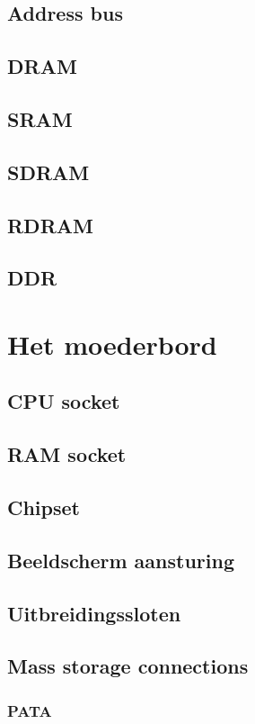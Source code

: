 \documentclass[a4paper,12pt,twoside,openright,titlepage]{book}
\begin{document}
\section{Address bus}
\section{DRAM}
\section{SRAM}
\section{SDRAM}
\section{RDRAM}
\section{DDR}

\chapter{Het moederbord}

\section{CPU socket}
\section{RAM socket}
\section{Chipset}
\section{Beeldscherm aansturing}
\section{Uitbreidingssloten}
\section{Mass storage connections}
\subsection{PATA}
\end{document}
